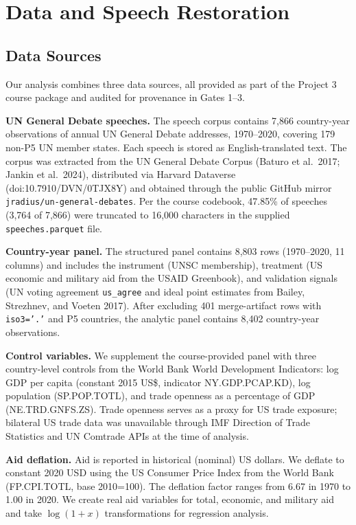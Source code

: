 \section{Data and Speech Restoration}\label{sec:data}

\subsection{Data Sources}

Our analysis combines three data sources, all provided as part of the Project 3 course package and audited for provenance in Gates 1--3.

\textbf{UN General Debate speeches.} The speech corpus contains 7,866 country-year observations of annual UN General Debate addresses, 1970--2020, covering 179 non-P5 UN member states. Each speech is stored as English-translated text. The corpus was extracted from the UN General Debate Corpus (Baturo et al.\ 2017; Jankin et al.\ 2024), distributed via Harvard Dataverse (doi:10.7910/DVN/0TJX8Y) and obtained through the public GitHub mirror \texttt{jradius/un-general-debates}. Per the course codebook, 47.85\% of speeches (3,764 of 7,866) were truncated to 16,000 characters in the supplied \texttt{speeches.parquet} file.

\textbf{Country-year panel.} The structured panel contains 8,803 rows (1970--2020, 11 columns) and includes the instrument (UNSC membership), treatment (US economic and military aid from the USAID Greenbook), and validation signals (UN voting agreement \texttt{us\_agree} and ideal point estimates from Bailey, Strezhnev, and Voeten 2017). After excluding 401 merge-artifact rows with \texttt{iso3='.'} and P5 countries, the analytic panel contains 8,402 country-year observations.

\textbf{Control variables.} We supplement the course-provided panel with three country-level controls from the World Bank World Development Indicators: log GDP per capita (constant 2015 US\$, indicator NY.GDP.PCAP.KD), log population (SP.POP.TOTL), and trade openness as a percentage of GDP (NE.TRD.GNFS.ZS). Trade openness serves as a proxy for US trade exposure; bilateral US trade data was unavailable through IMF Direction of Trade Statistics and UN Comtrade APIs at the time of analysis.

\textbf{Aid deflation.} Aid is reported in historical (nominal) US dollars. We deflate to constant 2020 USD using the US Consumer Price Index from the World Bank (FP.CPI.TOTL, base 2010=100). The deflation factor ranges from 6.67 in 1970 to 1.00 in 2020. We create real aid variables for total, economic, and military aid and take $\log(1+x)$ transformations for regression analysis.

